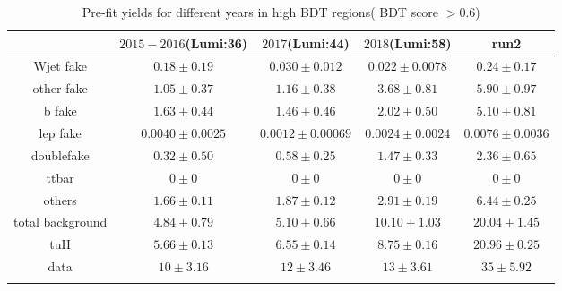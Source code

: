 \begin{table}[H]
\caption{Pre-fit yields for different years in high BDT regions( BDT score $>0.6$) }
\label{tab:pre_fit_diff_year_2}
\centering
\footnotesize
\begin{tabular}{ccccc} \toprule\toprule
& $2015-2016$(Lumi:36) & $2017$(Lumi:44)  & $2018$(Lumi:58)  & run2 \\\midrule

Wjet fake&		$0.18\pm0.19$        &    $0.030\pm0.012$    &   $0.022\pm0.0078$      &  $0.24\pm0.17$ \\
other fake&		$1.05\pm0.37$        &    $1.16\pm0.38$       &   $3.68\pm0.81$          &  $5.90\pm0.97$ \\
b fake&			$1.63\pm0.44$        &    $1.46\pm0.46$       &   $2.02\pm0.50$          &  $5.10\pm0.81$ \\
lep fake&		$0.0040\pm0.0025$    &   $0.0012\pm0.00069$  &   $0.0024\pm0.0024$     &  $0.0076\pm0.0036$ \\
doublefake&		$0.32\pm0.50$        &   $0.58\pm0.25$      &   $1.47\pm0.33$          &  $2.36\pm0.65$ \\
ttbar&			$0\pm0$              &    $0\pm0$            &   $0\pm0$                       &  $0\pm0$ \\
others&			$1.66\pm0.11$        &    $1.87\pm0.12$      &   $2.91\pm0.19$          &  $6.44\pm0.25$ \\
total background&$4.84\pm0.79$       &    $5.10\pm0.66$       &   $10.10\pm1.03$           &  $20.04\pm1.45$ \\
tuH&			$5.66\pm0.13$        &    $6.55\pm0.14$       &   $8.75\pm0.16$           &  $20.96\pm0.25$ \\
data&			$10\pm3.16$          &    $12\pm3.46$              &   $13\pm3.61$                &  $35\pm5.92$ \\

\bottomrule\bottomrule\\
\end{tabular}
\end{table}




\newpage
